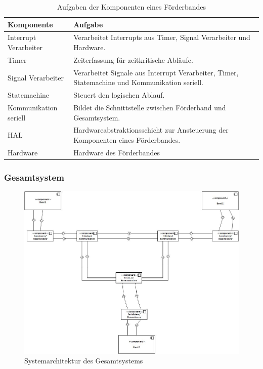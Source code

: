 \documentclass[a4paper, 11pt]{article}
\begin{document}
\begin{table}[h]
\center
\begin{tabularx}{\textwidth}{|l|X|}
\hline
\textbf{Komponente}&\textbf{Aufgabe}\\
\hline
Interrupt Verarbeiter&Verarbeitet Interrupts aus Timer, Signal Verarbeiter und Hardware.\\
\hline
Timer&Zeiterfassung für zeitkritische Abläufe.\\
\hline
Signal Verarbeiter&Verarbeitet Signale aus Interrupt Verarbeiter, Timer, Statemachine und Kommunikation seriell.\\
\hline
Statemachine&Steuert den logischen Ablauf.\\
\hline
Kommunikation seriell&Bildet die Schnittstelle zwischen Förderband und Gesamtsystem.\\
\hline
HAL&Hardwareabstraktionsschicht zur Ansteuerung der Komponenten eines Förderbandes.\\
\hline
Hardware&Hardware des Förderbandes\\
\hline
\end{tabularx}
\caption{Aufgaben der Komponenten eines Förderbandes}
\label{archinterntcomp}
\end{table}

\newpage

\subsubsection{Gesamtsystem}

\begin{figure}[h]
\centering 
\includegraphics[scale=0.60]{images/SW_Architektur/Gesamtsystem.jpg}
\caption{Systemarchitektur des Gesamtsystems}
\label{archtotal}
\end{figure}
\end{document}
